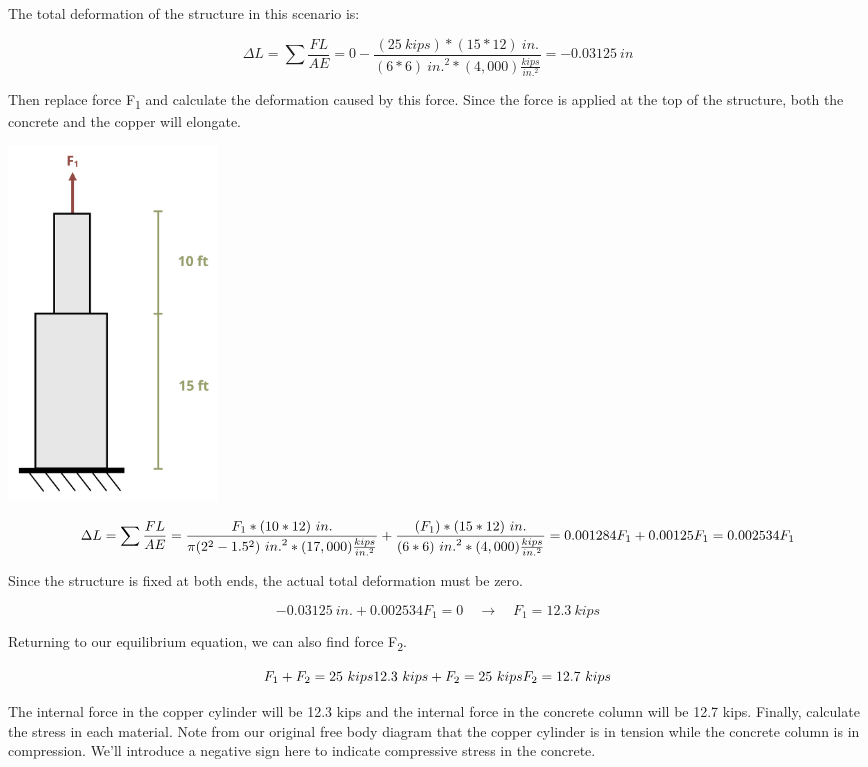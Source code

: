 \documentclass[
  letterpaper,
  DIV=11,
  numbers=noendperiod]{scrreprt}
\theoremstyle{definition}
\theoremstyle{remark}
\begin{document}
\begin{tcolorbox}
\begin{tcolorbox}
The total deformation of the structure in this scenario is:

\[
\Delta L=\sum \frac{F L}{A E}=0-\frac{(25{~kips}) *(15 * 12){~in.}}{(6 * 6){~in.}^2 *(4,000)\frac{kips}{in.^2}}=-0.03125{~in}
\]

Then replace force F\textsubscript{1} and calculate the deformation
caused by this force. Since the force is applied at the top of the
structure, both the concrete and the copper will elongate.

\begin{center}
\includegraphics[width=2.1875in,height=\textheight]{images/PNGs/Example 5.5 part 4.png}
\end{center}

\[
\Delta L=\sum \frac{F L}{A E}=\frac{F_1 *(10 * 12){~in.}}{\pi(2^2-1.5^2){~in.}^2 *(17,000)\frac{kips}{in.^2}}+\frac{\left(F_1\right) *(15 * 12){~in.}}{(6 * 6){~in.}^2 *(4,000)\frac{kips}{in.^2}} \\
=0.001284F_1+0.00125 F_1 \\
=0.002534 F_1
\]

Since the structure is fixed at both ends, the actual total deformation
must be zero.

\[
-0.03125{~in.}+0.002534 F_1=0 \quad\rightarrow\quad F_1=12.3{~kips}
\]

Returning to our equilibrium equation, we can also find force
F\textsubscript{2}.

\[
F_1+F_2=25{~kips} \\
12.3{~kips}+F_2=25{~kips} \\
F_2=12.7{~kips}
\]

The internal force in the copper cylinder will be 12.3 kips and the
internal force in the concrete column will be 12.7 kips. Finally,
calculate the stress in each material. Note from our original free body
diagram that the copper cylinder is in tension while the concrete column
is in compression. We'll introduce a negative sign here to indicate
compressive stress in the concrete.


\end{tcolorbox}
\end{tcolorbox}
\end{document}
